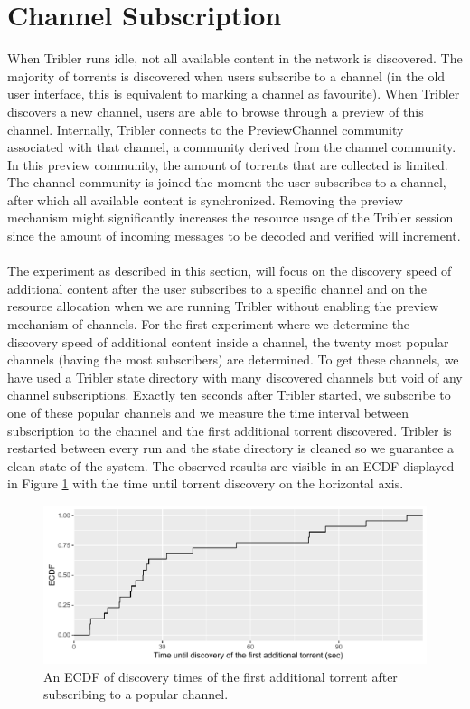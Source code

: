 \section{Channel Subscription}
When Tribler runs idle, not all available content in the network is discovered. The majority of torrents is discovered when users subscribe to a channel (in the old user interface, this is equivalent to marking a channel as favourite). When Tribler discovers a new channel, users are able to browse through a preview of this channel. Internally, Tribler connects to the PreviewChannel community associated with that channel, a community derived from the channel community. In this preview community, the amount of torrents that are collected is limited. The channel community is joined the moment the user subscribes to a channel, after which all available content is synchronized. Removing the preview mechanism might significantly increases the resource usage of the Tribler session since the amount of incoming messages to be decoded and verified will increment.\\\\
The experiment as described in this section, will focus on the discovery speed of additional content after the user subscribes to a specific channel and on the resource allocation when we are running Tribler without enabling the preview mechanism of channels. For the first experiment where we determine the discovery speed of additional content inside a channel, the twenty most popular channels (having the most subscribers) are determined. To get these channels, we have used a Tribler state directory with many discovered channels but void of any channel subscriptions. Exactly ten seconds after Tribler started, we subscribe to one of these popular channels and we measure the time interval between subscription to the channel and the first additional torrent discovered. Tribler is restarted between every run and the state directory is cleaned so we guarantee a clean state of the system. The observed results are visible in an ECDF displayed in Figure \ref{fig:channel-subscription} with the time until torrent discovery on the horizontal axis.

\begin{figure}[!h]
	\centering
	\includegraphics[width=1.0\columnwidth]{images/experiments/channel_subscription}
	\caption{An ECDF of discovery times of the first additional torrent after subscribing to a popular channel.}
	\label{fig:channel-subscription}
\end{figure}

